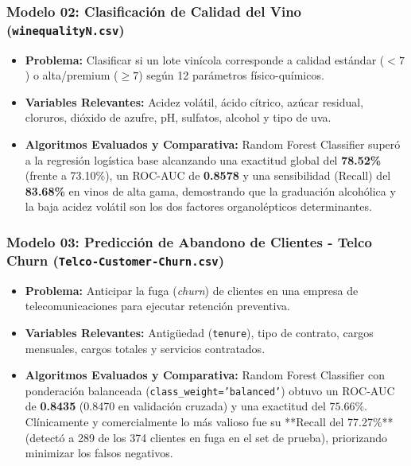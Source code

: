 \documentclass[12pt,letterpaper]{article}
\begin{document}
\subsubsection{Modelo 02: Clasificación de Calidad del Vino (\texttt{winequalityN.csv})}
\begin{itemize}[leftmargin=*]
    \item \textbf{Problema:} Clasificar si un lote vinícola corresponde a calidad estándar ($< 7$) o alta/premium ($\ge 7$) según 12 parámetros físico-químicos.
    \item \textbf{Variables Relevantes:} Acidez volátil, ácido cítrico, azúcar residual, cloruros, dióxido de azufre, pH, sulfatos, alcohol y tipo de uva.
    \item \textbf{Algoritmos Evaluados y Comparativa:} Random Forest Classifier superó a la regresión logística base alcanzando una exactitud global del \textbf{78.52\%} (frente a 73.10\%), un ROC-AUC de \textbf{0.8578} y una sensibilidad (Recall) del \textbf{83.68\%} en vinos de alta gama, demostrando que la graduación alcohólica y la baja acidez volátil son los dos factores organolépticos determinantes.
\end{itemize}

\subsubsection{Modelo 03: Predicción de Abandono de Clientes - Telco Churn (\texttt{Telco-Customer-Churn.csv})}
\begin{itemize}[leftmargin=*]
    \item \textbf{Problema:} Anticipar la fuga (\textit{churn}) de clientes en una empresa de telecomunicaciones para ejecutar retención preventiva.
    \item \textbf{Variables Relevantes:} Antigüedad (\texttt{tenure}), tipo de contrato, cargos mensuales, cargos totales y servicios contratados.
    \item \textbf{Algoritmos Evaluados y Comparativa:} Random Forest Classifier con ponderación balanceada (\texttt{class\_weight='balanced'}) obtuvo un ROC-AUC de \textbf{0.8435} (0.8470 en validación cruzada) y una exactitud del $75.66\%$. Clínicamente y comercialmente lo más valioso fue su **Recall del 77.27\%** (detectó a 289 de los 374 clientes en fuga en el set de prueba), priorizando minimizar los falsos negativos.
\end{itemize}
\end{document}

